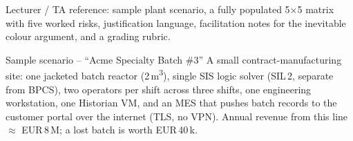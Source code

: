 \documentclass[11pt,a4paper]{article}
\begin{document}
\labheader

\begin{goalbox}
Lecturer / TA reference: sample plant scenario, a fully populated 5$\times$5 matrix with five worked risks, justification language, facilitation notes for the inevitable colour argument, and a grading rubric.
\end{goalbox}

\begin{solutionbox}{Sample scenario -- ``Acme Specialty Batch \#3''}
A small contract-manufacturing site: one jacketed batch reactor (2\,m\textsuperscript{3}), single SIS logic solver (SIL\,2, separate from BPCS), two operators per shift across three shifts, one engineering workstation, one Historian VM, and an MES that pushes batch records to the customer portal over the internet (TLS, no VPN). Annual revenue from this line $\approx$ EUR\,8\,M; a lost batch is worth EUR\,40\,k.
\end{solutionbox}
\end{document}
